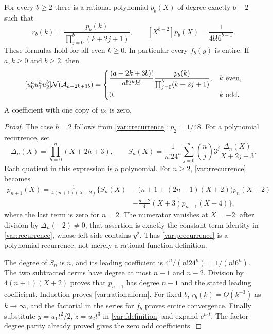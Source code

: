 \begin{theorem}
\label{var:rational}
For every $b\ge2$ there is a rational polynomial $p_b(X)$ of degree
exactly $b-2$ such that
\begin{equation}\label{var:rationalform}
 \boxed{\displaystyle
 r_b(k)=\frac{p_b(k)}{\prod_{j=0}^{b}(k+2j+1)},\qquad
 [X^{b-2}]p_b(X)=\frac1{4b!6^{b-1}}.}
\end{equation}
These formulas hold for all even $k\ge0$. In particular every
$f_b(y)$ is entire. If $a,k\ge0$ and $b\ge2$, then
\begin{equation}\label{var:allcoefficients}
 [u_0^au_1^ku_2^b]\mathcal N(\mathcal A_{a+2k+3b})
 =\begin{cases}
 \displaystyle\frac{(a+2k+3b)!}{a!2^kk!}
       \frac{p_b(k)}{\prod_{j=0}^b(k+2j+1)},& k\text{ even},\\[5pt]
 0,&k\text{ odd}.
 \end{cases}
\end{equation}
A coefficient with one copy of $u_2$ is zero.
\end{theorem}
\begin{proof}
The case $b=2$ follows from \eqref{var:rrecurrence}:
$p_2=1/48$. For a polynomial recurrence, set
\[
 \Delta_n(X)=\prod_{h=0}^n(X+2h+3),\qquad
 S_n(X)=\frac1{n!24^n}\sum_{j=0}^n
       \binom nj3^j\frac{\Delta_n(X)}{X+2j+3}.
\]
Each quotient in this expression is a polynomial. For $n\ge2$,
\eqref{var:rrecurrence} becomes
\begin{equation}\label{var:precurrence}
\begin{split}
 p_{n+1}(X)=\frac1{4(n+1)(X+2)}\bigg\{
 S_n(X)&-\bigl(n+1+(2n-1)(X+2)\bigr)p_n(X+2)\\
 &-\frac{n-2}{4}(X+3)p_{n-1}(X+4)\bigg\},
\end{split}
\end{equation}
where the last term is zero for $n=2$.
The numerator vanishes at $X=-2$: after division by
$\Delta_n(-2)\ne0$, that assertion is exactly the constant-term
identity in \eqref{var:recurrence}, whose left side contains $y^2$.
Thus \eqref{var:precurrence} is a polynomial recurrence, not merely
a rational-function definition.

The degree of $S_n$ is $n$, and its leading coefficient is
$4^n/(n!24^n)=1/(n!6^n)$. The two subtracted terms have degree at
most $n-1$ and $n-2$. Division by $4(n+1)(X+2)$ proves that
$p_{n+1}$ has degree $n-1$ and the stated leading coefficient.
Induction proves \eqref{var:rationalform}.
For fixed $b$, $r_b(k)=O(k^{-3})$ as $k\to\infty$, and the
factorial in the series for $f_b$ proves entire convergence.
Finally substitute $y=u_1t^2/2$, $z=u_2t^3$ in
\eqref{var:fdefinition} and expand $e^{u_0t}$.
The factor-degree parity already proved gives the zero odd coefficients.
\end{proof}


